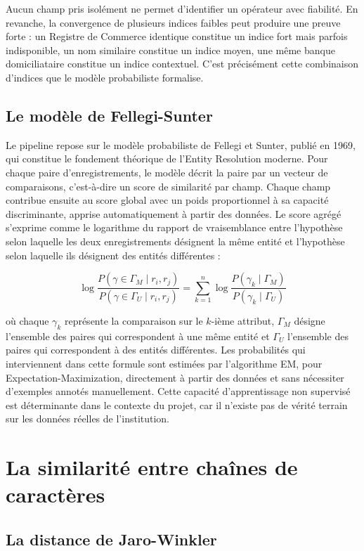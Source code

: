 Aucun champ pris isolément ne permet d'identifier un opérateur avec fiabilité. En revanche, la convergence de plusieurs indices faibles peut produire une preuve forte : un Registre de Commerce identique constitue un indice fort mais parfois indisponible, un nom similaire constitue un indice moyen, une même banque domiciliataire constitue un indice contextuel. C'est précisément cette combinaison d'indices que le modèle probabiliste formalise.

\subsection{Le modèle de Fellegi-Sunter}

Le pipeline repose sur le modèle probabiliste de Fellegi et Sunter, publié en 1969, qui constitue le fondement théorique de l'Entity Resolution moderne. Pour chaque paire d'enregistrements, le modèle décrit la paire par un vecteur de comparaisons, c'est-à-dire un score de similarité par champ. Chaque champ contribue ensuite au score global avec un poids proportionnel à sa capacité discriminante, apprise automatiquement à partir des données. Le score agrégé s'exprime comme le logarithme du rapport de vraisemblance entre l'hypothèse selon laquelle les deux enregistrements désignent la même entité et l'hypothèse selon laquelle ils désignent des entités différentes :

\[
\log \frac{P(\gamma \in \Gamma_M \mid r_i, r_j)}{P(\gamma \in \Gamma_U \mid r_i, r_j)} = \sum_{k=1}^{n} \log \frac{P(\gamma_k \mid \Gamma_M)}{P(\gamma_k \mid \Gamma_U)}
\]

où chaque $\gamma_k$ représente la comparaison sur le $k$-ième attribut, $\Gamma_M$ désigne l'ensemble des paires qui correspondent à une même entité et $\Gamma_U$ l'ensemble des paires qui correspondent à des entités différentes. Les probabilités qui interviennent dans cette formule sont estimées par l'algorithme EM, pour Expectation-Maximization, directement à partir des données et sans nécessiter d'exemples annotés manuellement. Cette capacité d'apprentissage non supervisé est déterminante dans le contexte du projet, car il n'existe pas de vérité terrain sur les données réelles de l'institution.

\section{La similarité entre chaînes de caractères}

\subsection{La distance de Jaro-Winkler}

